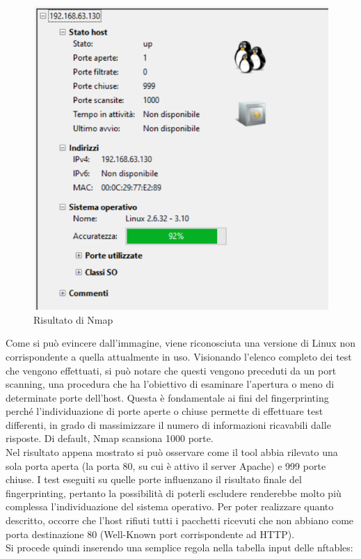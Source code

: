 \begin{figure}[h]
	\centering
	\includegraphics[scale=0.85]{figures/primo_nmap.png}
	\caption{Risultato di Nmap}
	\label{primo_nmap}
\end{figure}

Come si può evincere dall'immagine, viene riconosciuta una versione di Linux non corrispondente a quella attualmente in uso.
Visionando l'elenco completo dei test che vengono effettuati, si può notare che questi vengono preceduti da un port scanning, una procedura che ha l'obiettivo di esaminare l'apertura o meno di determinate porte dell'host.
Questa è fondamentale ai fini del fingerprinting perché l'individuazione di porte aperte o chiuse permette di effettuare test differenti, in grado di massimizzare il numero di informazioni ricavabili dalle risposte. Di default, Nmap scansiona 1000 porte.
\\
Nel risultato appena mostrato si può osservare come il tool abbia rilevato una sola porta aperta (la porta 80, su cui è attivo il server Apache) e 999 porte chiuse. I test eseguiti su quelle porte influenzano il risultato finale del fingerprinting, pertanto la possibilità di poterli escludere renderebbe molto più complessa l'individuazione del sistema operativo.
Per poter realizzare quanto descritto, occorre che l'host rifiuti tutti i pacchetti ricevuti che non abbiano come porta destinazione 80 (Well-Known port corrispondente ad HTTP).
\\
Si procede quindi inserendo una semplice regola nella tabella input delle nftables:

